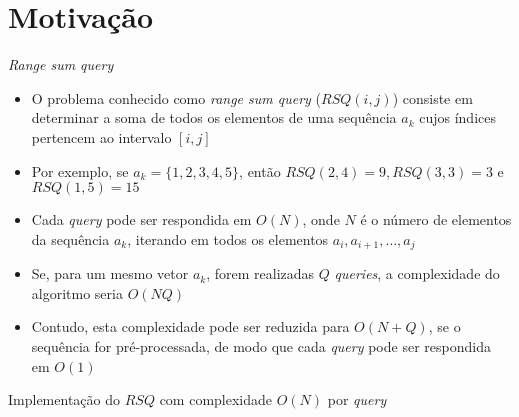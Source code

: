 \section{Motivação}

\begin{frame}[fragile]{\it {Range sum query}}

    \begin{itemize}
        \item O problema conhecido como \textit{range sum query} ($RSQ(i, j)$) consiste em 
            determinar a 
            soma de todos os elementos de uma sequência $a_k$ cujos índices pertencem ao
            intervalo $[i, j]$

        \item Por exemplo, se $a_k = \lbrace 1, 2, 3, 4, 5\rbrace$, então $RSQ(2, 4) = 9,
            RSQ(3, 3) = 3$ e $RSQ(1, 5) = 15$

        \item Cada \textit{query} pode ser respondida em $O(N)$, onde $N$ é o número de elementos
            da sequência $a_k$, iterando em todos os elementos $a_i, a_{i + 1}, \ldots, a_j$

        \item Se, para um mesmo vetor $a_k$, forem realizadas $Q$ \textit{queries}, a complexidade
            do algoritmo seria $O(NQ)$

        \item Contudo, esta complexidade pode ser reduzida para $O(N + Q)$, se o sequência 
            for pré-processada, de modo que cada \textit{query} pode ser respondida em $O(1)$

    \end{itemize}

\end{frame}

\begin{frame}[fragile]{Implementação do $RSQ$ com complexidade $O(N)$ por {\it query}}
\end{frame}

